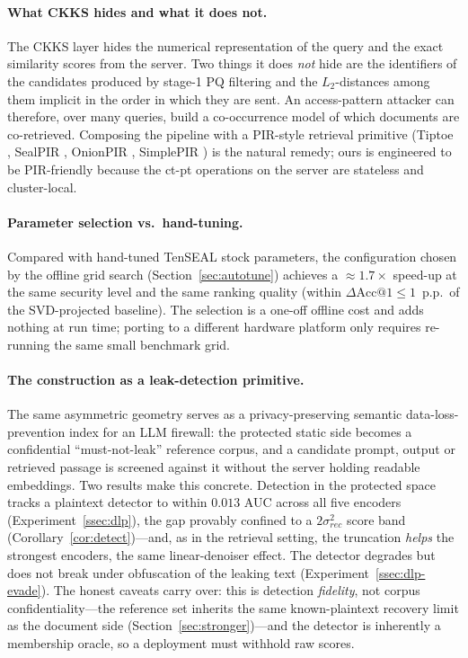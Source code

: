 \documentclass[11pt,a4paper]{article}
\begin{document}
\paragraph{What CKKS hides and what it does not.} The CKKS layer hides
the numerical representation of the query and the exact similarity
scores from the server. Two things it does \emph{not} hide are the
identifiers of the candidates produced by stage-1 PQ filtering and the
$L_2$-distances among them implicit in the order in which they are
sent. An access-pattern attacker can therefore, over many queries,
build a co-occurrence model of which documents are co-retrieved.
Composing the pipeline with a PIR-style retrieval primitive (Tiptoe
\cite{ref_tiptoe}, SealPIR \cite{ref_sealpir}, OnionPIR
\cite{ref_onionpir}, SimplePIR \cite{ref_simplepir}) is the natural
remedy; ours is engineered to be PIR-friendly because the
ct-pt operations on the server are stateless and cluster-local.

\paragraph{Parameter selection vs.\ hand-tuning.} Compared with hand-tuned
TenSEAL stock parameters, the configuration chosen by the offline grid search
(Section~\ref{sec:autotune}) achieves a $\approx 1.7\times$ speed-up at the
same security level and the same ranking quality (within
$\Delta \mathrm{Acc@1} \leq 1$~p.p.\ of the SVD-projected baseline). The
selection is a one-off offline cost and adds nothing at run time; porting to a
different hardware platform only requires re-running the same small benchmark
grid.

\paragraph{The construction as a leak-detection primitive.} The same
asymmetric geometry serves as a privacy-preserving semantic
data-loss-prevention index for an LLM firewall: the protected static side
becomes a confidential ``must-not-leak'' reference corpus, and a candidate
prompt, output or retrieved passage is screened against it without the
server holding readable embeddings. Two results make this concrete.
Detection in the protected space tracks a plaintext detector to within
$0.013$ AUC across all five encoders (Experiment~\ref{ssec:dlp}), the gap
provably confined to a $2\sigma_{rec}^2$ score band
(Corollary~\ref{cor:detect})---and, as in the retrieval setting, the
truncation \emph{helps} the strongest encoders, the same linear-denoiser
effect. The detector degrades but does not break under obfuscation of the
leaking text (Experiment~\ref{ssec:dlp-evade}). The honest caveats carry
over: this is detection \emph{fidelity}, not corpus confidentiality---the
reference set inherits the same known-plaintext recovery limit as the
document side (Section~\ref{sec:stronger})---and the detector is inherently
a membership oracle, so a deployment must withhold raw scores.
\end{document}
